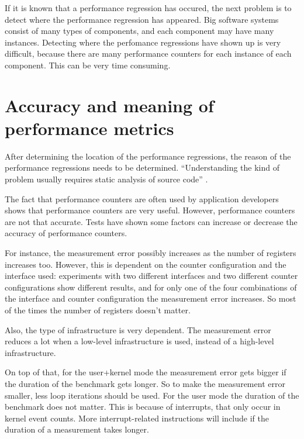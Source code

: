 If it is known that a performance regression has occured, the next problem is to detect where the performance regression has appeared. Big software systems consist of many types of components, and each component may have many instances. Detecting where the perfomance regressions have shown up is very difficult, because there are many performance counters for each instance of each component. This can be very time consuming.

\section{Accuracy and meaning of performance metrics}
After determining the location of the performance regressions, the reason of the performance regressions needs to be determined. ``Understanding the kind of problem usually requires static analysis of source code'' \cite{nguyen2012using}.

The fact that performance counters are often used by application developers shows that performance counters are very useful. However, performance counters are not that accurate. Tests have shown some factors can increase or decrease the accuracy of performance counters.

For instance, the measurement error possibly increases as the number of registers increases too. However, this is dependent on the counter configuration and the interface used: experiments with two different interfaces and two different counter configurations show different results, and for only one of the four combinations of the interface and counter configuration the measurement error increases\cite{AccuracyPerformanceCounter}. So most of the times the number of registers doesn't matter.

Also, the type of infrastructure is very dependent. The measurement error reduces a lot when a low-level infrastructure is used, instead of a high-level infrastructure\cite{AccuracyPerformanceCounter}.

On top of that, for the user+kernel mode the measurement error gets bigger if the duration of the benchmark gets longer\cite{AccuracyPerformanceCounter}. So to make the measurement error smaller, less loop iterations should be used.  For the user mode the duration of the benchmark does not matter. This is because of interrupts, that only occur in kernel event counts. More interrupt-related instructions will include if the duration of a measurement takes longer.
